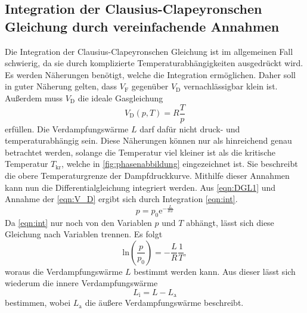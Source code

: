 \subsection{Integration der Clausius-Clapeyronschen Gleichung durch vereinfachende Annahmen}
\label{subsec:T_int}
Die Integration der Clausius-Clapeyronschen Gleichung ist im allgemeinen Fall schwierig, da sie durch komplizierte Temperaturabhängigkeiten ausgedrückt wird. Es werden Näherungen benötigt, welche
die Integration ermöglichen. Daher soll in guter Näherung gelten, dass $V_\text{F}$ gegenüber $V_\text{D}$ vernachlässigbar klein ist. Außerdem muss $V_\text{D}$ die ideale Gasgleichung
\begin{equation}
    \label{eqn:V_D}
    V_\text{D}(p,T) = R\frac{T}{p}
\end{equation} 
erfüllen. Die Verdampfungswärme $L$ darf dafür nicht druck- und temperaturabhängig sein. Diese Näherungen können nur als hinreichend genau betrachtet werden, solange die Temperatur
viel kleiner ist als die kritische Temperatur $T_\text{kr}$, welche in \autoref{fig:phasenabbildung} eingezeichnet ist. Sie beschreibt die obere
Temperaturgrenze der Dampfdruckkurve. Mithilfe dieser Annahmen kann nun die Differentialgleichung integriert werden. Aus \autoref{eqn:DGL1} und Annahme der \autoref{eqn:V_D} ergibt sich durch Integration
\autoref{eqn:int}.
\begin{equation}
    \label{eqn:int}
    p = p_0\text{e}^{-\frac{L}{RT}}
\end{equation}
Da \autoref{eqn:int} nur noch von den Variablen $p$ und $T$ abhängt, lässt sich diese Gleichung nach Variablen trennen. Es folgt
\begin{equation}
    \label{eqn:gerade}
    \text{ln}\left(\frac{p}{p_0}\right) = -\frac{L}{R}\frac{1}{T},
\end{equation}
woraus die Verdampfungswärme $L$ bestimmt werden kann. Aus dieser lässt sich wiederum die innere Verdampfungswärme
\begin{equation}
    \label{eqn:LI}
    L_\text{i} = L - L_\text{a}
\end{equation}
bestimmen, wobei $L_\text{a}$ die äußere Verdampfungswärme beschreibt.
